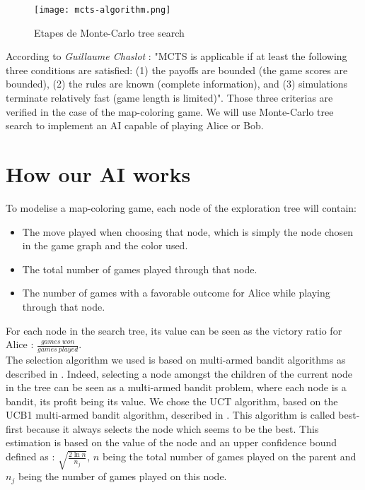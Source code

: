 \begin{figure}
\centering
\texttt{[image: mcts-algorithm.png]}
\caption{Etapes de Monte-Carlo tree search}
\label{treesearch}
\end{figure}

According to \emph{Guillaume Chaslot} \cite{ChaPHD} : "MCTS is
applicable if at least the following three conditions are satisfied: (1) the payoffs are bounded
(the game scores are bounded), (2) the rules are known (complete information), and (3) simulations terminate relatively fast (game length is limited)". Those three criterias are verified in the case of the map-coloring game. We will use Monte-Carlo tree search to implement an AI capable of playing Alice or Bob.\\

\section{How our AI works}

To modelise a map-coloring game, each node of the exploration tree will contain:
\begin{itemize}
\item The move played when choosing that node, which is simply the node chosen in the game graph and the color used.
\item The total number of games played through that node.
\item The number of games with a favorable outcome for Alice while playing through that node.
\end{itemize}
For each node in the search tree, its value can be seen as the victory ratio for Alice : $\frac{games \ won}{games \ played}$.\\

The selection algorithm we used is based on multi-armed bandit algorithms as described in \cite{MAB}. Indeed, selecting a node amongst the children of the current node in the tree can be seen as a multi-armed bandit problem, where each node is a bandit, its profit being its value. We chose the UCT algorithm, based on the UCB1 multi-armed bandit algorithm, described in \cite{ChaPHD}. This algorithm is called best-first because it always selects the node which seems to be the best. This estimation is based on the value of the node and an upper confidence bound defined as : 
$ \sqrt{\frac{2\ln{n}}{n_j}}$, $n$ being the total number of games played on the parent and $n_j$ being the number of games played on this node.\\

